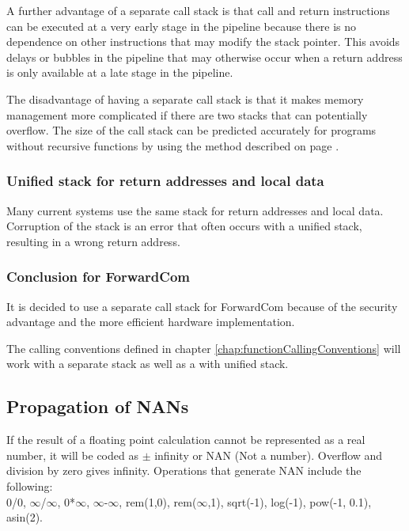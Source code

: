 \documentclass[forwardcom.tex]{subfiles}
\begin{document}
A further advantage of a separate call stack is that call and return instructions can be executed at a very early stage in the pipeline because there is no dependence on other instructions that may modify the stack pointer. This avoids delays or bubbles in the pipeline that may otherwise occur when a return address is only available at a late stage in the pipeline.
\vspace{2mm}

The disadvantage of having a separate call stack is that it makes memory management more complicated if there are two stacks that can potentially overflow. The size of the call stack can be predicted accurately for programs without recursive functions by using the method described on page \pageref{predictingStackSize}.
\vspace{2mm}

\subsubsection{Unified stack for return addresses and local data} \label{singleStack}
Many current systems use the same stack for return addresses and local data. 
Corruption of the stack is an error that often occurs with a unified stack, resulting in a wrong return address.
\vspace{2mm}

\subsubsection{Conclusion for ForwardCom}
It is decided to use a separate call stack for ForwardCom because of the security advantage and the more efficient hardware implementation. \\
\vspace{2mm}

The calling conventions defined in chapter \ref{chap:functionCallingConventions} will 
work with a separate stack as well as a with unified stack.
\vspace{2mm}


\subsection{Propagation of NANs}
\label{nanPropagation}
If the result of a floating point calculation cannot be represented as a real number, it will be coded as $\pm$ infinity or NAN (Not a number). Overflow and division by zero gives infinity.
Operations that generate NAN include the following:\\
0/0, $\infty$/$\infty$, 0*$\infty$, $\infty$-$\infty$, rem(1,0), rem($\infty$,1), sqrt(-1), log(-1), pow(-1, 0.1), asin(2).
\vspace{2mm}
\end{document}
